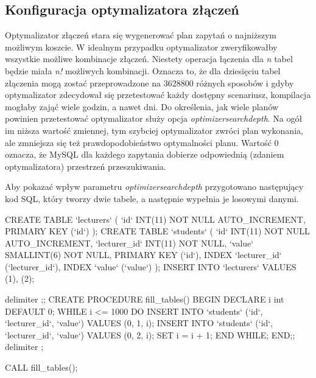 \subsection{Konfiguracja optymalizatora złączeń}
Optymalizator złączeń stara się wygenerować plan zapytań o najniższym możliwym koszcie. W idealnym przypadku optymalizator zweryfikowałby wszystkie możliwe kombinacje złączeń. Niestety operacja łączenia dla \textit{n} tabel będzie miała \textit{n!} możliwych kombinacji. Oznacza to, że dla dziesięciu tabel złączenia mogą zostać przeprowadzone na 3628800 różnych sposobów i gdyby optymalizator zdecydował się przetestować każdy dostępny scenariusz, kompilacja mogłaby zająć wiele godzin, a nawet dni. Do określenia, jak wiele planów powinien przetestować optymalizator służy opcja \textit{optimizer\textunderscore search\textunderscore depth}. Na ogół im niższa wartość zmiennej, tym szybciej optymalizator zwróci plan wykonania, ale zmniejsza się też prawdopodobieństwo optymalności planu. Wartość 0 oznacza, że MySQL dla każdego zapytania dobierze odpowiednią (zdaniem optymalizatora) przestrzeń przeszukiwania.

Aby pokazać wpływ parametru \textit{optimizer\textunderscore search\textunderscore depth} przygotowano następujący kod SQL, który tworzy dwie tabele, a następnie wypełnia je losowymi danymi.

\begin{spverbatim}
	CREATE TABLE `lecturers`
	(
	`id` INT(11) NOT NULL AUTO_INCREMENT,
	PRIMARY KEY (`id`)
	);
	CREATE TABLE `students`
	(
	`id` INT(11) NOT NULL AUTO_INCREMENT,
	`lecturer_id` INT(11) NOT NULL,
	`value` SMALLINT(6) NOT NULL,
	PRIMARY KEY (`id`),
	INDEX `lecturer_id` (`lecturer_id`),
	INDEX `value` (`value`)
	);
	INSERT INTO `lecturers` VALUES (1), (2);
	
	delimiter ;;
	CREATE PROCEDURE fill_tables()
	BEGIN
		DECLARE i int DEFAULT 0;
		WHILE i <= 1000 DO
			INSERT INTO `students` (`id`, `lecturer_id`, `value`) VALUES (0, 1, i);
			INSERT INTO `students` (`id`, `lecturer_id`, `value`) VALUES (0, 2, i);
			SET i = i + 1;
		END WHILE;
	END;;
	delimiter ;
	
	CALL fill_tables();
\end{spverbatim}

